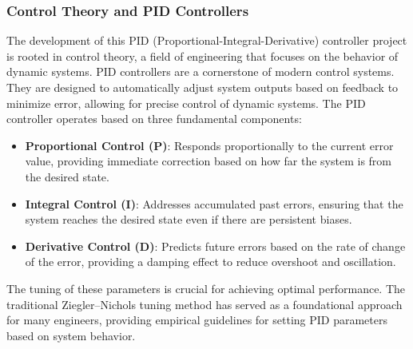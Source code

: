 \documentclass[a4paper,12pt]{article}
\begin{document}
\begin{lstlising}[language=C++]
\subsubsection{Control Theory and PID Controllers}
The development of this PID (Proportional-Integral-Derivative) controller project is rooted in control theory, a field of engineering that focuses on the behavior of dynamic systems. PID controllers are a cornerstone of modern control systems. They are designed to automatically adjust system outputs based on feedback to minimize error, allowing for precise control of dynamic systems. The PID controller operates based on three fundamental components:
\begin{itemize}
\item \textbf{Proportional Control (P)}: Responds proportionally to the current error value, providing immediate correction based on how far the system is from the desired state.
\item \textbf{Integral Control (I)}: Addresses accumulated past errors, ensuring that the system reaches the desired state even if there are persistent biases.
\item \textbf{Derivative Control (D)}: Predicts future errors based on the rate of change of the error, providing a damping effect to reduce overshoot and oscillation.
\end{itemize}
The tuning of these parameters is crucial for achieving optimal performance. The traditional Ziegler–Nichols tuning method has served as a foundational approach for many engineers, providing empirical guidelines for setting PID parameters based on system behavior.

\end{lstlising}
\end{document}
